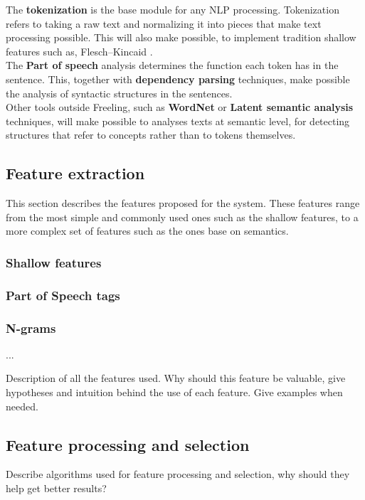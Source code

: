\documentclass[12pt]{article}
\begin{document}
The \textbf{tokenization} is the base module for any NLP processing. Tokenization refers to taking a raw text and normalizing it into pieces that make text processing possible. This will also make possible, to implement tradition shallow features such as, Flesch–Kincaid \cite{flesch}. \\

The \textbf{Part of speech} analysis determines the function each token has in the sentence. This, together with \textbf{dependency parsing} techniques, make possible the analysis of syntactic structures in the sentences.\\

Other tools outside Freeling, such as \textbf{WordNet} or \textbf{Latent semantic analysis} techniques, will make possible to analyses texts at semantic level, for detecting structures that refer to concepts rather than to tokens themselves.\\


\subsection{Feature extraction}
This section describes the features proposed for the system. These features range from the most simple and commonly used ones such as the shallow features, to a more complex set of features such as the ones base on semantics.

\subsubsection*{Shallow features}
\subsubsection*{Part of Speech tags}

\subsubsection*{N-grams}

...

Description of all the features used. Why should this feature be valuable, give hypotheses and intuition behind the use of each feature. Give examples when needed.

\subsection{Feature processing and selection}
Describe algorithms used for feature processing and selection, why should they help get better results?
\end{document}
